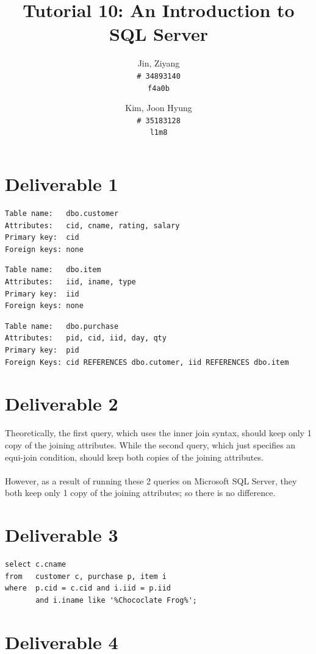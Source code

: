 \documentclass{article}
\title{Tutorial 10: An Introduction to SQL Server}
\author{
	Jin, Ziyang\\
	\texttt{\# 34893140}\\
	\texttt{f4a0b}
	\and
	Kim, Joon Hyung\\
	\texttt{\# 35183128}\\
	\texttt{l1m8}
}
\begin{document}
	\maketitle

\section{Deliverable 1}

\begin{verbatim}
Table name:   dbo.customer
Attributes:   cid, cname, rating, salary
Primary key:  cid
Foreign keys: none
\end{verbatim}

\begin{verbatim}
Table name:   dbo.item
Attributes:   iid, iname, type
Primary key:  iid
Foreign keys: none
\end{verbatim}

\begin{verbatim}
Table name:   dbo.purchase
Attributes:   pid, cid, iid, day, qty
Primary key:  pid
Foreign Keys: cid REFERENCES dbo.cutomer, iid REFERENCES dbo.item
\end{verbatim}





\section{Deliverable 2}

Theoretically, the first query, which uses the inner join syntax, should keep only 1 copy of the joining attributes. While the second query, which just specifies an equi-join condition, should keep both copies of the joining attributes. \\
\\
\noindent However, as a result of running these 2 queries on Microsoft SQL Server, they both keep only 1
 copy of the joining attributes; so there is no difference.

\section{Deliverable 3}

\begin{verbatim}
select c.cname
from   customer c, purchase p, item i
where  p.cid = c.cid and i.iid = p.iid 
       and i.iname like '%Chococlate Frog%';
\end{verbatim}

\section{Deliverable 4}
\end{document}
